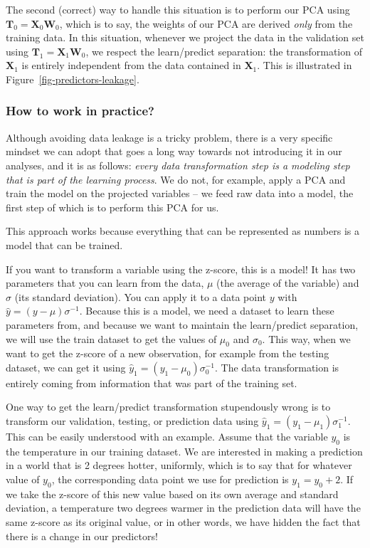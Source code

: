 \documentclass[
  letterpaper,
]{scrbook}
\begin{document}
The second (correct) way to handle this situation is to perform our PCA
using \(\mathbf{T}_0 = \mathbf{X}_0\mathbf{W}_0\), which is to say, the
weights of our PCA are derived \emph{only} from the training data. In
this situation, whenever we project the data in the validation set using
\(\mathbf{T}_1 = \mathbf{X}_1\mathbf{W}_0\), we respect the
learn/predict separation: the transformation of \(\mathbf{X}_1\) is
entirely independent from the data contained in \(\mathbf{X}_1\). This
is illustrated in Figure~\ref{fig-predictors-leakage}.

\subsubsection{How to work in practice?}\label{how-to-work-in-practice}

Although avoiding data leakage is a tricky problem, there is a very
specific mindset we can adopt that goes a long way towards not
introducing it in our analyses, and it is as follows: \emph{every data
transformation step is a modeling step that is part of the learning
process}. We do not, for example, apply a PCA and train the model on the
projected variables -- we feed raw data into a model, the first step of
which is to perform this PCA for us.

This approach works because everything that can be represented as
numbers is a model that can be trained.

If you want to transform a variable using the z-score, this is a model!
It has two parameters that you can learn from the data, \(\mu\) (the
average of the variable) and \(\sigma\) (its standard deviation). You
can apply it to a data point \(y\) with
\(\hat y = (y - \mu)\sigma^{-1}\). Because this is a model, we need a
dataset to learn these parameters from, and because we want to maintain
the learn/predict separation, we will use the train dataset to get the
values of \(\mu_0\) and \(\sigma_0\). This way, when we want to get the
z-score of a new observation, for example from the testing dataset, we
can get it using \(\hat y_1 = (y_1 - \mu_0)\sigma_0^{-1}\). The data
transformation is entirely coming from information that was part of the
training set.

One way to get the learn/predict transformation stupendously wrong is to
transform our validation, testing, or prediction data using
\(\hat y_1 = (y_1 - \mu_1)\sigma_1^{-1}\). This can be easily understood
with an example. Assume that the variable \(y_0\) is the temperature in
our training dataset. We are interested in making a prediction in a
world that is 2 degrees hotter, uniformly, which is to say that for
whatever value of \(y_0\), the corresponding data point we use for
prediction is \(y_1 = y_0 + 2\). If we take the z-score of this new
value based on its own average and standard deviation, a temperature two
degrees warmer in the prediction data will have the same z-score as its
original value, or in other words, we have hidden the fact that there is
a change in our predictors!
\end{document}
